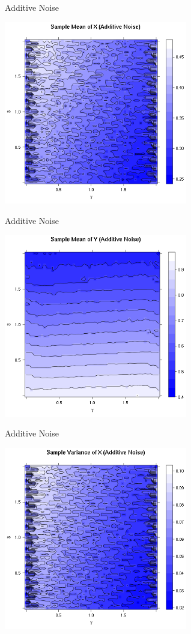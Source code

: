 \begin{frame}{Additive Noise}
\begin{center}
	\includegraphics[width=8cm]{img/sampleMeanXAdditiveNoise} 
\end{center}
\end{frame}

\begin{frame}{Additive Noise}
\begin{center}
	\includegraphics[width=8cm]{img/sampleMeanYAdditiveNoise} 
\end{center}
\end{frame}

\begin{frame}{Additive Noise}
\begin{center}
	\includegraphics[width=8cm]{img/sampleVarianceXAdditiveNoise} 
\end{center}
\end{frame}

